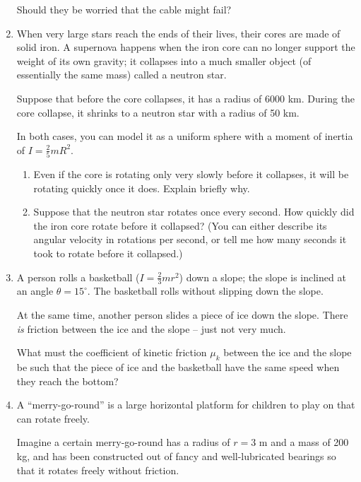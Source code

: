 \documentclass[12pt]{article}
\begin{document}
\begin{enumerate}
	Should they be worried that the cable might fail?
	
	\bigskip
	\bigskip

\item When very large stars reach the ends of their lives, their cores are made of solid iron. A supernova happens
	when the iron core can no longer support the weight of its own gravity; it collapses into a much smaller object (of essentially the same
mass) called a neutron star.

Suppose that before the core collapses, it has a radius of 6000 km. During the core collapse, it shrinks to a neutron star with
a radius of 50 km. 

In both cases, you can model it as a uniform sphere with a moment of inertia of $I = \frac{2}{5}mR^2$.

\begin{enumerate}

	\item  Even if the core is rotating only very slowly before it collapses, it will be rotating quickly once it does. Explain briefly
why.

\item Suppose that the neutron star rotates once every second. How quickly did the iron core rotate before it collapsed? (You can
either describe its angular velocity in rotations per second, or tell me how many seconds it took to rotate before it collapsed.)
\end{enumerate}


\bigskip

	\bigskip
	
\item A person rolls a basketball ($I=\frac{2}{3}mr^2$) down a slope; the slope is inclined at an angle $\theta=15^\circ$. The basketball rolls without slipping down the slope.

At the same time, another person slides a piece of ice down the slope. There {\it is} friction between the ice and the slope -- just not very much.

What must the coefficient of kinetic friction $\mu_k$ between the ice and the slope be such that the piece of ice and the basketball have the same speed when they reach the bottom?

\bigskip
\bigskip
\newpage

\item A ``merry-go-round'' is a large horizontal platform for children to play on that can rotate freely. 

\begin{minipage}{0.5\textwidth}
Imagine a certain merry-go-round has a radius of $r=3$ m and a mass of 200 kg, and has been constructed out of fancy and well-lubricated bearings so that it rotates freely without friction.
\bigskip



\end{minipage}
\end{enumerate}
\end{document}
